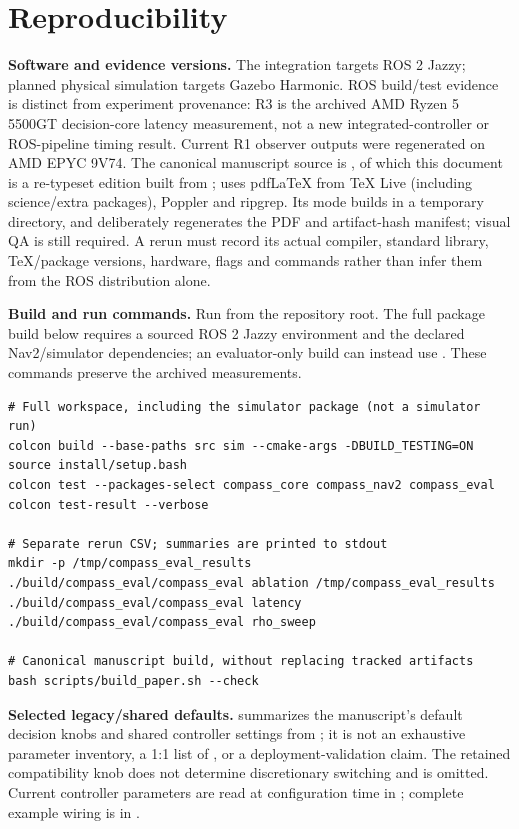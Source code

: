\section{Reproducibility}\label{app:repro}

\noindent\textbf{Software and evidence versions.} The integration targets ROS 2 Jazzy; planned physical simulation targets Gazebo Harmonic. ROS build/test evidence is distinct from experiment provenance: R3 is the archived AMD Ryzen 5 5500GT decision-core latency measurement, not a new integrated-controller or ROS-pipeline timing result. Current R1 observer outputs were regenerated on AMD EPYC 9V74. The canonical manuscript source is , of which this document is a re-typeset edition built from ;  uses pdfLaTeX from TeX Live (including science/extra packages), Poppler and ripgrep. Its  mode builds in a temporary directory, and  deliberately regenerates the PDF and artifact-hash manifest; visual QA is still required. A rerun must record its actual compiler, standard library, TeX/package versions, hardware, flags and commands rather than infer them from the ROS distribution alone.

\noindent\textbf{Build and run commands.} Run from the repository root. The full package build below requires a sourced ROS 2 Jazzy environment and the declared Nav2/simulator dependencies; an evaluator-only build can instead use . These commands preserve the archived measurements.

\begin{verbatim}
# Full workspace, including the simulator package (not a simulator run)
colcon build --base-paths src sim --cmake-args -DBUILD_TESTING=ON
source install/setup.bash
colcon test --packages-select compass_core compass_nav2 compass_eval
colcon test-result --verbose

# Separate rerun CSV; summaries are printed to stdout
mkdir -p /tmp/compass_eval_results
./build/compass_eval/compass_eval ablation /tmp/compass_eval_results
./build/compass_eval/compass_eval latency
./build/compass_eval/compass_eval rho_sweep

# Canonical manuscript build, without replacing tracked artifacts
bash scripts/build_paper.sh --check
\end{verbatim}

\noindent\textbf{Selected legacy/shared defaults.}  summarizes the manuscript's default decision knobs and shared controller settings from ; it is not an exhaustive parameter inventory, a 1:1 list of , or a deployment-validation claim. The retained compatibility knob  does not determine discretionary switching and is omitted. Current controller parameters are read at configuration time in ; complete example wiring is in .

